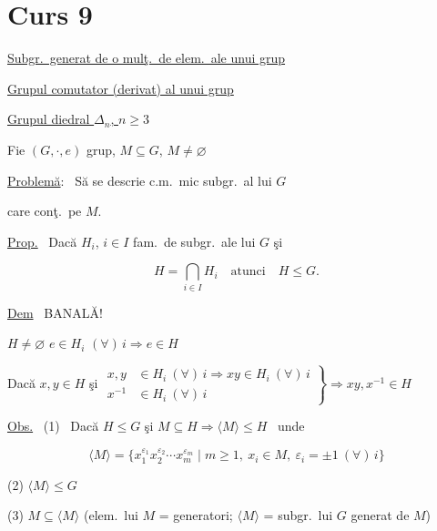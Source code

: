 \newpage
\section{Curs 9}

\begin{center}
\end{center}
\begin{flushright}
\end{flushright}



\bigskip
\noindent\underline{Subgr.\ generat de o mulţ.\ de elem.\ ale unui grup}

\noindent\underline{Grupul comutator (derivat) al unui grup}

\noindent\underline{Grupul diedral $\Delta_n$, $n\geq 3$}

\bigskip
\bigskip
\noindent Fie $(G,\cdot,e)$ grup, $M\subseteq G$, $M\neq\varnothing$

\noindent\underline{Problemă}: \ Să se descrie c.m.\ mic subgr.\ al lui $G$

\noindent care conţ.\ pe $M$.

\bigskip
\noindent\underline{Prop.} \ Dacă $H_i$, $i\in I$ fam.\ de subgr.\ ale lui $G$ şi

\[
H=\bigcap_{i\in I} H_i \quad \text{atunci} \quad H\leq G.
\]

\bigskip
\noindent\underline{Dem} \ BANALĂ!

\noindent $H\neq\varnothing$ \quad $e\in H_i$ $(\forall)\,i \Rightarrow e\in H$

\noindent Dacă $x,y\in H$ şi $\left.\begin{aligned}x,y&\in H_i\ (\forall)\,i \Rightarrow xy\in H_i\ (\forall)\,i\\ x^{-1}&\in H_i\ (\forall)\,i\end{aligned}\right\} \Rightarrow xy,x^{-1}\in H$

\bigskip
\noindent\underline{Obs.} \ (1) \ Dacă $H\leq G$ şi $M\subseteq H \Rightarrow \langle M\rangle \leq H$ \ unde

\[
\langle M\rangle = \{x_1^{\varepsilon_1}x_2^{\varepsilon_2}\cdots x_m^{\varepsilon_m} \mid m\geq 1,\ x_i\in M,\ \varepsilon_i=\pm 1\ (\forall)\,i\}
\]

\noindent (2) $\langle M\rangle \leq G$

\noindent (3) $M\subseteq \langle M\rangle$ \quad (elem.\ lui $M$ = generatori; $\langle M\rangle$ = subgr.\ lui $G$ generat de $M$)

